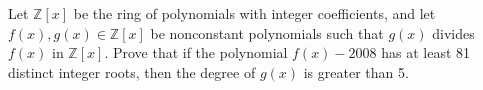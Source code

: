 Let $ \mathbb{Z}[x]$ be the ring of polynomials with integer coefficients, and let $ f(x), g(x) \in\mathbb{Z}[x]$ be nonconstant polynomials such that $ g(x)$ divides $ f(x)$ in $ \mathbb{Z}[x]$. Prove that if the polynomial $ f(x)-2008$ has at least 81 distinct integer roots, then the degree of $ g(x)$ is greater than 5.